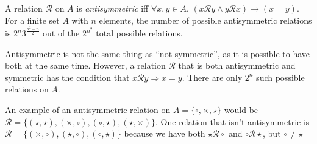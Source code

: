 \documentclass{article}
\begin{document}
A relation $\mathcal{R}$ on $A$ is \emph{antisymmetric} iff
$\forall x, y \in A$, $(x\mathcal{R}y \land y\mathcal{R}x)\rightarrow (x=y)$.
For a finite set $A$ with $n$ elements, the number of possible antisymmetric relations is $2^n 3^{\frac{n^2-n}{2}}$ out of the $2^{n^2}$ total possible
relations.

Antisymmetric is not the same thing as ``not symmetric'', as it is possible
to have both at the same time. However, a relation $\mathcal{R}$ that is both
antisymmetric and symmetric has the condition that $ x\mathcal{R}y \Rightarrow x=y $.
There are only $2^n$ such possible relations on $A$.

An example of an antisymmetric relation on $A = \{\circ, \times, \star\}$
would be $\mathcal{R} = \{(\star,\star),(\times,\circ),(\circ,\star),(\star,\times)\}$.
One relation that isn't antisymmetric is $\mathcal{R} = \{ (\times,\circ), (\star, \circ), (\circ,\star) \} $
because we have both $\star \mathcal{R} \circ$ and $\circ \mathcal{R} \star$, but $\circ \not = \star$
\end{document}
